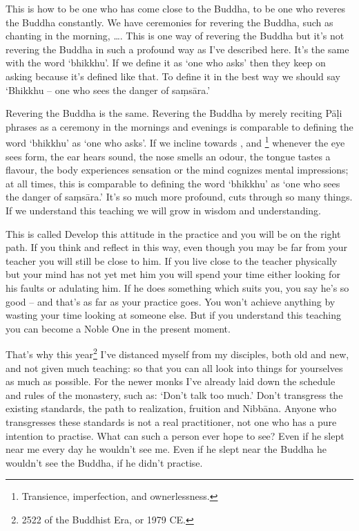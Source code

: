 This is how to be one who has come close to the Buddha, to be one who reveres the Buddha constantly. We have ceremonies for revering the Buddha, such as chanting in the morning,  \ldots{}. This is one way of revering the Buddha but it's not revering the Buddha in such a profound way as I've described here. It's the same with the word `bhikkhu'. If we define it as `one who asks' then they keep  on asking because it's defined like that. To define it in the best way we should say `Bhikkhu -- one who sees the danger of sa\d{m}s\=ara.'

Revering the Buddha is the same. Revering the Buddha by merely reciting P\=a\d{l}i phrases as a ceremony in the mornings and evenings is comparable to defining the word `bhikkhu' as `one who asks'. If we incline towards ,  and \footnote{Transience, imperfection, and ownerlessness.} whenever the eye sees form, the ear hears sound, the nose smells an odour, the tongue tastes a flavour, the body experiences sensation or the mind cognizes mental impressions; at all times, this is comparable to defining the word `bhikkhu' as `one who sees the danger of sa\d{m}s\=ara.' It's so much more profound, cuts through so many things. If we understand this teaching we will grow in wisdom and understanding.

This is called  Develop this attitude in the practice and you will be on the right path. If you think and reflect in this way, even though you may be far from your teacher you will still be close to him. If you live close to the teacher physically but your mind has not yet met him you will spend your time either looking for his faults or adulating him. If he does something which suits you, you say he's so good -- and that's as far as your practice goes. You won't achieve anything by wasting your time looking at someone else. But if you understand this teaching you can become a Noble One in the present moment.

That's why this year\footnote{2522 of the Buddhist Era, or 1979 CE.} I've distanced myself from my disciples, both old and new, and not given much teaching: so that you can all look into things for yourselves as much as possible. For the newer monks I've already laid down the schedule and rules of the monastery, such as: `Don't talk too much.' Don't transgress the existing standards, the path to realization, fruition and Nibb\=ana. Anyone who transgresses these standards is not a real practitioner, not one who has a pure intention to practise. What can such a person ever hope to see? Even if he slept near me every day he wouldn't see me. Even if he slept near the Buddha he wouldn't see the Buddha, if he didn't practise.

